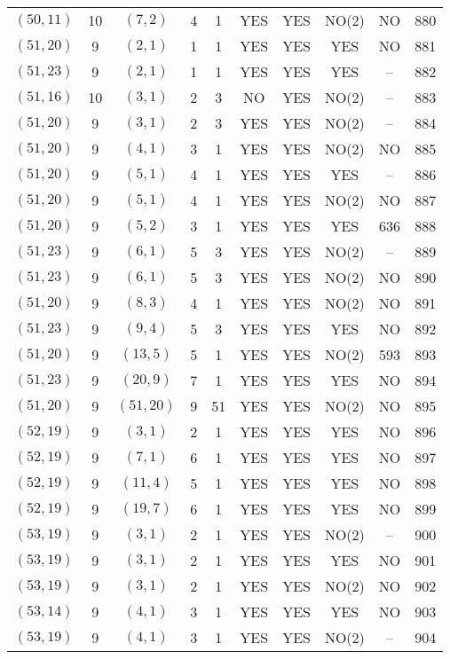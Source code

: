 \begin{longtable}{|c|c|c|c|c|c|c|c|c|c|}
$(50, 11)$ & 10 & $(7, 2)$ & 4 & 1 & YES & YES & NO(2) & NO & 880\\
$(51, 20)$ & 9 & $(2, 1)$ & 1 & 1 & YES & YES & YES & NO & 881\\
$(51, 23)$ & 9 & $(2, 1)$ & 1 & 1 & YES & YES & YES & -- & 882\\
$(51, 16)$ & 10 & $(3, 1)$ & 2 & 3 & NO & YES & NO(2) & -- & 883\\
$(51, 20)$ & 9 & $(3, 1)$ & 2 & 3 & YES & YES & NO(2) & -- & 884\\
$(51, 20)$ & 9 & $(4, 1)$ & 3 & 1 & YES & YES & NO(2) & NO & 885\\
$(51, 20)$ & 9 & $(5, 1)$ & 4 & 1 & YES & YES & YES & -- & 886\\
$(51, 20)$ & 9 & $(5, 1)$ & 4 & 1 & YES & YES & NO(2) & NO & 887\\
$(51, 20)$ & 9 & $(5, 2)$ & 3 & 1 & YES & YES & YES & 636 & 888\\
$(51, 23)$ & 9 & $(6, 1)$ & 5 & 3 & YES & YES & NO(2) & -- & 889\\
$(51, 23)$ & 9 & $(6, 1)$ & 5 & 3 & YES & YES & NO(2) & NO & 890\\
$(51, 20)$ & 9 & $(8, 3)$ & 4 & 1 & YES & YES & NO(2) & NO & 891\\
$(51, 23)$ & 9 & $(9, 4)$ & 5 & 3 & YES & YES & YES & NO & 892\\
$(51, 20)$ & 9 & $(13, 5)$ & 5 & 1 & YES & YES & NO(2) & 593 & 893\\
$(51, 23)$ & 9 & $(20, 9)$ & 7 & 1 & YES & YES & YES & NO & 894\\
$(51, 20)$ & 9 & $(51, 20)$ & 9 & 51 & YES & YES & NO(2) & NO & 895\\
$(52, 19)$ & 9 & $(3, 1)$ & 2 & 1 & YES & YES & YES & NO & 896\\
$(52, 19)$ & 9 & $(7, 1)$ & 6 & 1 & YES & YES & YES & NO & 897\\
$(52, 19)$ & 9 & $(11, 4)$ & 5 & 1 & YES & YES & YES & NO & 898\\
$(52, 19)$ & 9 & $(19, 7)$ & 6 & 1 & YES & YES & YES & NO & 899\\
$(53, 19)$ & 9 & $(3, 1)$ & 2 & 1 & YES & YES & NO(2) & -- & 900\\
$(53, 19)$ & 9 & $(3, 1)$ & 2 & 1 & YES & YES & YES & NO & 901\\
$(53, 19)$ & 9 & $(3, 1)$ & 2 & 1 & YES & YES & NO(2) & NO & 902\\
$(53, 14)$ & 9 & $(4, 1)$ & 3 & 1 & YES & YES & YES & NO & 903\\
$(53, 19)$ & 9 & $(4, 1)$ & 3 & 1 & YES & YES & NO(2) & -- & 904\\

\end{longtable}
